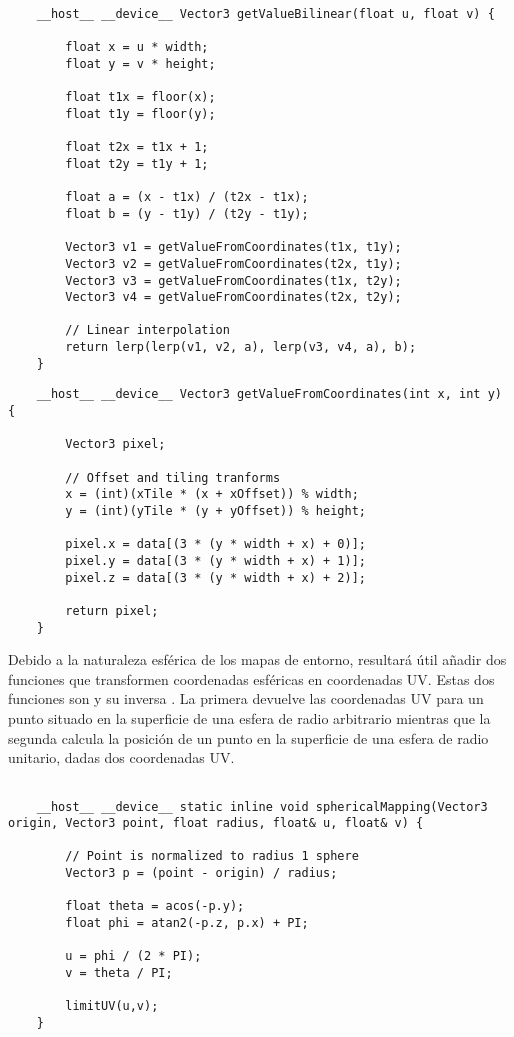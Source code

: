 	
	\begin{lstlisting}
	__host__ __device__ Vector3 getValueBilinear(float u, float v) {
        
        float x = u * width;
        float y = v * height;

        float t1x = floor(x);
        float t1y = floor(y);

        float t2x = t1x + 1;
        float t2y = t1y + 1;

        float a = (x - t1x) / (t2x - t1x);
        float b = (y - t1y) / (t2y - t1y);

        Vector3 v1 = getValueFromCoordinates(t1x, t1y);
        Vector3 v2 = getValueFromCoordinates(t2x, t1y);
        Vector3 v3 = getValueFromCoordinates(t1x, t2y);
        Vector3 v4 = getValueFromCoordinates(t2x, t2y);

		// Linear interpolation
        return lerp(lerp(v1, v2, a), lerp(v3, v4, a), b);
	}
	\end{lstlisting}

	\begin{lstlisting}
    __host__ __device__ Vector3 getValueFromCoordinates(int x, int y) {
	
        Vector3 pixel;

        // Offset and tiling tranforms
        x = (int)(xTile * (x + xOffset)) % width;
        y = (int)(yTile * (y + yOffset)) % height;

        pixel.x = data[(3 * (y * width + x) + 0)];
        pixel.y = data[(3 * (y * width + x) + 1)];
        pixel.z = data[(3 * (y * width + x) + 2)];

        return pixel;
    }
	\end{lstlisting}

	Debido a la naturaleza esférica de los mapas de entorno, resultará útil añadir dos funciones que transformen coordenadas esféricas en coordenadas UV. Estas dos funciones son  y su inversa . La primera devuelve las coordenadas UV para un punto situado en la superficie de una esfera de radio arbitrario mientras que la segunda calcula la posición de un punto en la superficie de una esfera de radio unitario, dadas dos coordenadas UV.

	\begin{lstlisting}
	
    __host__ __device__ static inline void sphericalMapping(Vector3 origin, Vector3 point, float radius, float& u, float& v) {

        // Point is normalized to radius 1 sphere
        Vector3 p = (point - origin) / radius;

        float theta = acos(-p.y);
        float phi = atan2(-p.z, p.x) + PI;

        u = phi / (2 * PI);
        v = theta / PI;

        limitUV(u,v);
    }
	
	\end{lstlisting}
	
